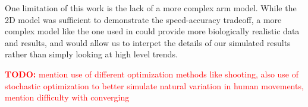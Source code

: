 \documentclass[letterpaper, 10pt, conference]{ieeeconf}
\newcommand{\todo}[1]{\textcolor{red}{\textbf{TODO:} #1}}
\begin{document}
One limitation of this work is the lack of a more complex arm model. While the 2D model was sufficient to demonstrate the speed-accuracy tradeoff, a more complex model like the one used in \cite{original_paper_high_fidelity} could provide more biologically realistic data and results, and would allow us to interpet the details of our simulated results rather than simply looking at high level trends.

\todo{mention use of different optimization methods like shooting, also use of stochastic optimization to better simulate natural variation in human movements, mention difficulty with converging}
\end{document}
